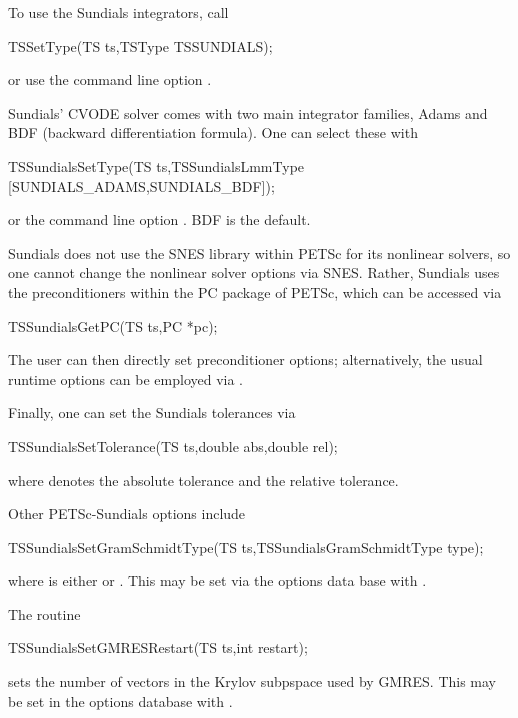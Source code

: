 To use the Sundials integrators, call
\begin{tabbing}
 TSSetType(TS ts,TSType TSSUNDIALS);
\end{tabbing}
or use the command line option  .
  

Sundials' CVODE solver comes with two main integrator families, Adams
and BDF (backward differentiation formula). One can select these with
\begin{tabbing}
 TSSundialsSetType(TS ts,TSSundialsLmmType [SUNDIALS\_ADAMS,SUNDIALS\_BDF]);
\end{tabbing}
or the command line option . BDF is
the default. 
 

Sundials does not use the SNES library within PETSc for its nonlinear
solvers, so one cannot change the nonlinear solver options via
SNES. Rather, Sundials uses the preconditioners within the PC package
of PETSc, which can be accessed via
\begin{tabbing}
 TSSundialsGetPC(TS ts,PC *pc);
\end{tabbing}
The user can then directly set preconditioner options;
alternatively, the usual runtime options can be employed
via .

Finally, one can set the Sundials tolerances via
\begin{tabbing}
 TSSundialsSetTolerance(TS ts,double abs,double rel);
\end{tabbing}
where  denotes the absolute tolerance and 
the relative tolerance.

Other PETSc-Sundials options include
\begin{tabbing}
  TSSundialsSetGramSchmidtType(TS ts,TSSundialsGramSchmidtType type);
\end{tabbing}
where  is either  or
.
 This may be set via the options data base
with .

The routine
\begin{tabbing}
  TSSundialsSetGMRESRestart(TS ts,int restart);
\end{tabbing}
sets the number of vectors in the Krylov subpspace used by GMRES.
This may be set in the options
database with  . 


